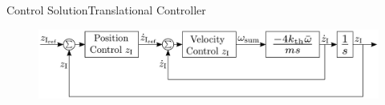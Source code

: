 \begin{frame}{Control Solution}{Translational Controller}
  \vspace*{1cm}
  \Large
  \normalsize
  \pause
  \vspace*{1cm}
  \begin{figure}[H]
    \includegraphics[width=1\linewidth]{figures/TranslationalControlZ}
  \end{figure}
\end{frame}


